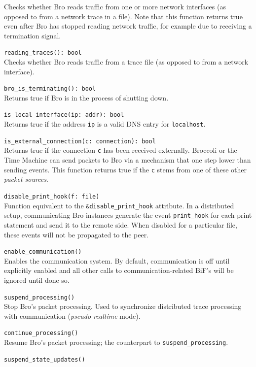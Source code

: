 \documentclass[10pt,landscape]{article}
\newcommand{\verbose}[1]{#1}
\newcommand{\verbose}[1]{}
\begin{document}
\begin{multicols*}{2}
\begin{itemize}
{    Checks whether Bro reads traffic from one or more network interfaces (as
    opposed to from a network trace in a file). Note that this function returns
    true even after Bro has stopped reading network traffic, for example due to
    receiving a termination signal.
  \item \verb|reading_traces(): bool|\\
    Checks whether Bro reads traffic from a trace file (as opposed to
    from a network interface).
  \item \verb|bro_is_terminating(): bool|\\
    Returns true if Bro is in the process of shutting down.
}
  \item \verb|is_local_interface(ip: addr): bool|\\
    Returns true if the address \verb|ip| is a valid DNS entry for
    \texttt{localhost}.
\verbose{
  \item \verb|is_external_connection(c: connection): bool|\\
    Returns true if the connection \verb|c| has been received externally.
    Broccoli or the Time Machine can send packets to Bro via a mechanism that
    one step lower than sending events. This function returns true if the
    \verb|c| stems from one of these other \emph{packet sources}.
  \item \verb|disable_print_hook(f: file)|\\
    Function equivalent to the \verb|&disable_print_hook| attribute. In a
    distributed setup, communicating Bro instances generate the event
    \verb|print_hook| for each print statement and send it to the remote side.
    When disabled for a particular file, these events will not be propagated to
    the peer.
  \item \verb|enable_communication()|\\
    Enables the communication system. By default, communication is off until
    explicitly enabled and all other calls to communication-related BiF's will
    be ignored until done so.
  \item \verb|suspend_processing()|\\
    Stop Bro's packet processing. Used to synchronize distributed trace
    processing with communication (\emph{pseudo-realtime} mode).
  \item \verb|continue_processing()|\\
    Resume Bro's packet processing; the counterpart to
    \verb|suspend_processing|.
  \item \verb|suspend_state_updates()|\\
}
\end{itemize}
\end{multicols*}
\end{document}
